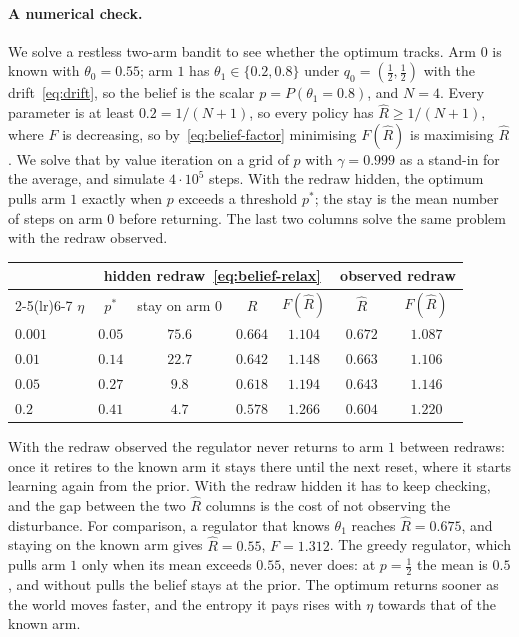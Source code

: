 \documentclass[11pt]{article}
\theoremstyle{remark}
\newcommand{\1}{\mathds{1}}
\begin{document}
\paragraph{A numerical check.}
We solve a restless two-arm bandit to see whether the optimum tracks.
Arm $0$ is known with $\theta_0=0.55$; arm $1$ has $\theta_1\in\{0.2,0.8\}$ under $q_0=(\tfrac12,\tfrac12)$ with the drift~\eqref{eq:drift}, so the belief is the scalar $p=P(\theta_1=0.8)$, and $N=4$.
Every parameter is at least $0.2=1/(N+1)$, so every policy has $\hat R\ge1/(N+1)$, where $F$ is decreasing, so by~\eqref{eq:belief-factor} minimising $F(\hat R)$ is maximising $\hat R$.
We solve that by value iteration on a grid of $p$ with $\gamma=0.999$ as a stand-in for the average, and simulate $4\cdot10^5$ steps.
With the redraw hidden, the optimum pulls arm $1$ exactly when $p$ exceeds a threshold $p^\ast$; the stay is the mean number of steps on arm $0$ before returning.
The last two columns solve the same problem with the redraw observed.
\begin{center}
\begin{tabular}{lcccccc}
\toprule
& \multicolumn{4}{c}{hidden redraw~\eqref{eq:belief-relax}} & \multicolumn{2}{c}{observed redraw} \\
\cmidrule(lr){2-5}\cmidrule(lr){6-7}
$\eta$ & $p^\ast$ & stay on arm $0$ & $\hat R$ & $F(\hat R)$ & $\hat R$ & $F(\hat R)$ \\
\midrule
$0.001$ & $0.05$ & $75.6$ & $0.664$ & $1.104$ & $0.672$ & $1.087$ \\
$0.01$ & $0.14$ & $22.7$ & $0.642$ & $1.148$ & $0.663$ & $1.106$ \\
$0.05$ & $0.27$ & $9.8$ & $0.618$ & $1.194$ & $0.643$ & $1.146$ \\
$0.2$ & $0.41$ & $4.7$ & $0.578$ & $1.266$ & $0.604$ & $1.220$ \\
\bottomrule
\end{tabular}
\end{center}
With the redraw observed the regulator never returns to arm $1$ between redraws: once it retires to the known arm it stays there until the next reset, where it starts learning again from the prior.
With the redraw hidden it has to keep checking, and the gap between the two $\hat R$ columns is the cost of not observing the disturbance.
For comparison, a regulator that knows $\theta_1$ reaches $\hat R=0.675$, and staying on the known arm gives $\hat R=0.55$, $F=1.312$.
The greedy regulator, which pulls arm $1$ only when its mean exceeds $0.55$, never does: at $p=\tfrac12$ the mean is $0.5$, and without pulls the belief stays at the prior.
The optimum returns sooner as the world moves faster, and the entropy it pays rises with $\eta$ towards that of the known arm.
\end{document}
